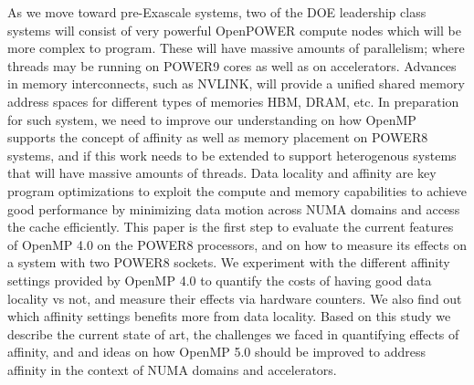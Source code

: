 As we move toward pre-Exascale systems, two of the DOE leadership class systems will consist of very powerful OpenPOWER compute nodes which will be more complex to program. These will have massive amounts of parallelism; where threads may be running on POWER9 cores as well as on accelerators. Advances in memory interconnects, such as NVLINK, will provide a unified shared memory address spaces for different types of memories HBM, DRAM, etc. In preparation for such system, we need to improve our understanding on how OpenMP supports the concept of affinity as well as memory placement on POWER8 systems, and if this work needs to be extended to support heterogenous systems that will have massive amounts of threads. Data locality and affinity are key 
program optimizations to exploit the compute and memory capabilities to achieve good performance by minimizing data motion across NUMA domains and access the cache efficiently. This paper is the first step to evaluate the current features of OpenMP 4.0 on the POWER8 processors, and on how to measure its effects on a system with two POWER8 sockets. We experiment with the different affinity settings provided by OpenMP 4.0 to quantify the costs of having good data locality vs not,  and measure their effects via hardware counters. We also find out which affinity settings benefits more from data locality. Based on this study we describe the current state of art, the challenges we faced in quantifying effects of affinity, and and ideas on how OpenMP 5.0 should be improved to address affinity in the context of NUMA domains and accelerators.


